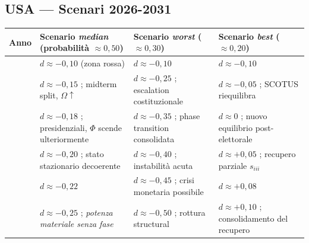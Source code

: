 \subsection{USA --- Scenari 2026-2031}\label{usa-scenari-2026-2031}

{\def\LTcaptype{none} %
{\small\begin{longtable}[]{@{}
  >{\raggedright\arraybackslash}p{}
  >{\raggedright\arraybackslash}p{}
  >{\raggedright\arraybackslash}p{}
  >{\raggedright\arraybackslash}p{}@{}}
\toprule\noalign{}
\begin{minipage}[b]{\linewidth}\raggedright
Anno
\end{minipage} & \begin{minipage}[b]{\linewidth}\raggedright
Scenario \emph{median} (probabilità \(\approx 0{,}50\))
\end{minipage} & \begin{minipage}[b]{\linewidth}\raggedright
Scenario \emph{worst} (\(\approx 0{,}30\))
\end{minipage} & \begin{minipage}[b]{\linewidth}\raggedright
Scenario \emph{best} (\(\approx 0{,}20\))
\end{minipage} \\
\midrule\noalign{}
\endhead
\bottomrule\noalign{}
\endlastfoot
2026 & \(d \approx -0{,}10\) (zona rossa) & \(d \approx -0{,}10\) &
\(d \approx -0{,}10\) \\
2027 & \(d \approx -0{,}15\) ; midterm split, \(\Omega \uparrow\) &
\(d \approx -0{,}25\) ; escalation costituzionale &
\(d \approx -0{,}05\) ; SCOTUS riequilibra \\
2028 & \(d \approx -0{,}18\) ; presidenziali, \(\Phi\) scende
ulteriormente & \(d \approx -0{,}35\) ; phase transition consolidata
& \(d \approx 0\) ; nuovo equilibrio post-elettorale \\
2029 & \(d \approx -0{,}20\) ; stato stazionario decoerente &
\(d \approx -0{,}40\) ; instabilità acuta & \(d \approx +0{,}05\) ;
recupero parziale \(s_{iii}\) \\
2030 & \(d \approx -0{,}22\) & \(d \approx -0{,}45\) ; crisi monetaria
possibile & \(d \approx +0{,}08\) \\
2031 & \(d \approx -0{,}25\) ; \emph{potenza materiale senza fase} &
\(d \approx -0{,}50\) ; rottura structural & \(d \approx +0{,}10\) ;
consolidamento del recupero \\
\end{longtable}}
}


